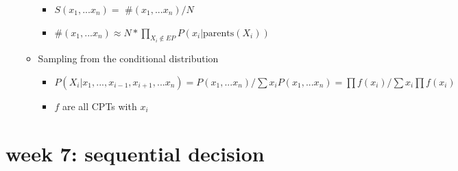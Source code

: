 \documentclass[10pt]{article}
\begin{document}
\begin{itemize}[label=\(\star\), leftmargin=1em, itemsep=-0.3em]
\begin{itemize}[label=\(\star\), leftmargin=5em, itemsep=-0.2em]
\begin{itemize}[label=\(\star\), leftmargin=5em, itemsep=-0.2em]
                        \item[] $S(x_1, ... x_n) =$ \#$(x_1, ... x_n) / N$
                        \item[] \#$(x_1, ... x_n)\approx  N * \prod_{X_i \notin EP } P(x_i|\text{parents}(X_i))$
                    \end{itemize}
              \item Sampling from the conditional distribution
                    \begin{itemize}[label=\(\star\), leftmargin=5em, itemsep=-0.2em]
                        \item[] $P(X_i| x_1, ..., x_{i-1}, x_{i+1},... x_n) = P(x_1, ... x_n) / \sum x_i P(x_1, ... x_n) = \prod f(x_i) / \sum x_i \prod f(x_i)$
                        \item[] $f$ are all CPTs with $x_i$
                    \end{itemize}
          \end{itemize}
\end{itemize}



\section*{week 7: sequential decision}
\end{document}
